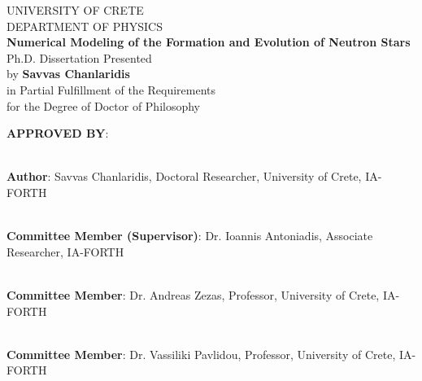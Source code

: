 \documentclass[main.tex]{subfiles}
\begin{document}
\newpage
    \thispagestyle{empty}
    \begin{center}
        UNIVERSITY OF CRETE \\
        \vspace{0.25cm}
        DEPARTMENT OF PHYSICS \\
        \vspace{0.5cm}
        \textbf{Numerical Modeling of the Formation and Evolution of Neutron Stars} \\
        \vspace{0.5cm}
        Ph.D. Dissertation Presented \\
        \vspace{0.5cm}
        by \textbf{Savvas Chanlaridis} \\
        \vspace{0.5cm}
        in Partial Fulfillment of the Requirements \\
        \vspace{0.5cm}
        for the Degree of Doctor of Philosophy
    \end{center}
     \vspace{0.8cm}
     
    \noindent \textbf{APPROVED BY}:\\
    \vspace*{1.0cm}
    
    \noindent\hrulefill \\
    \noindent\textbf{Author}: Savvas Chanlaridis, Doctoral Researcher, University of Crete, IA-FORTH \\
    \vspace*{0.5cm}
    
    \noindent\hrulefill \\
    \noindent\textbf{Committee Member (Supervisor)}: Dr. Ioannis Antoniadis, Associate Researcher, IA-FORTH \\
    \vspace*{0.5cm}    
    
    \noindent\hrulefill \\
    \noindent\textbf{Committee Member}: Dr. Andreas Zezas, Professor, University of Crete, IA-FORTH \\
    \vspace*{0.5cm}    
    
    \noindent\hrulefill \\
    \noindent\textbf{Committee Member}: Dr. Vassiliki Pavlidou, Professor, University of Crete, IA-FORTH \\
    \vspace*{0.5cm}    
\end{document}
